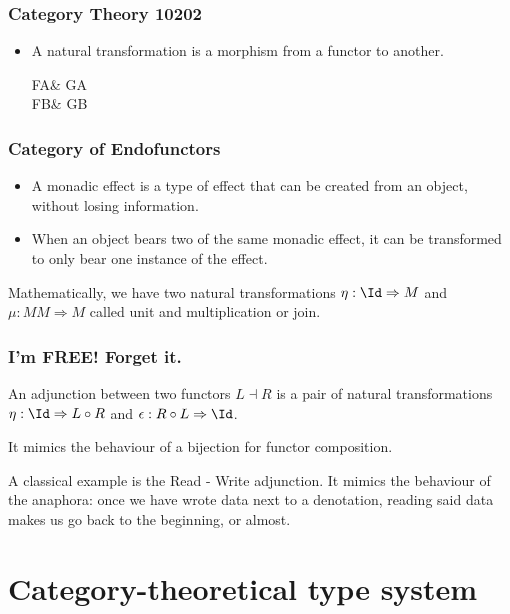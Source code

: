 \documentclass[math, english, info]{beamercours}
\begin{document}
\begin{frame}[fragile]
	\frametitle{Category Theory 10202}
	\begin{itemize}
		\item A natural transformation is a morphism from a functor to another.
		      \pause
		      \begin{category}
			      FA\ar[r, "\theta_{A}"]\ar[d, "F\phi"'] & GA\ar[d, "G\phi"]\\
			      FB\ar[r, "\theta_{B}"'] & GB
		      \end{category}
	\end{itemize}
\end{frame}

\begin{frame}[fragile]
	\frametitle{Category of Endofunctors}
	\begin{itemize}
		\item A monadic effect is a type of effect that can be created from an
		      object, without losing information.
		\item When an object bears two of the same monadic effect, it can be
		      transformed to only bear one instance of the effect.
	\end{itemize}
	\pause

	Mathematically, we have two natural transformations $\eta: \Id \Rightarrow M$
	and $\mu: MM \Rightarrow M$ called unit and multiplication or join.
\end{frame}

\begin{frame}[fragile]
	\frametitle{I'm FREE! Forget it.}
	An adjunction between two functors $L \dashv R$ is a pair of natural
	transformations $\eta: \Id \Rightarrow L \circ R$ and $\epsilon: R \circ L
		\Rightarrow \Id$.

	\smallskip

	It mimics the behaviour of a bijection for functor composition.

	\pause

	A classical example is the Read - Write adjunction.
	It mimics the behaviour of the anaphora: once we have wrote data next to a
	denotation, reading said data makes us go back to the beginning, or almost.
\end{frame}

\section{Category-theoretical type system}
\end{document}
